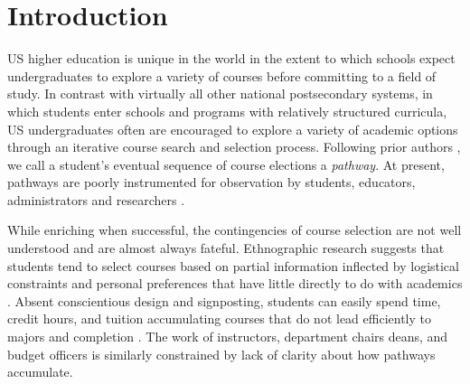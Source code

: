 \section{Introduction}



US higher education is unique in the world in the extent to
which schools expect undergraduates to explore a variety of courses before committing to a field of study. In contrast with virtually all other national postsecondary systems, in which students enter schools and programs with relatively structured curricula, US undergraduates often are encouraged to explore a variety of academic options through an iterative course search and selection process. Following prior authors \cite{armstrong2013paying,bailey2015redesigning}, we call a student's
eventual sequence of course elections a {\it pathway}. At present, pathways are poorly instrumented for observation by students, educators, administrators and researchers \cite{chambliss2014college}.

While enriching when successful, the contingencies of course selection are not well understood and are almost always fateful. Ethnographic research suggests that students tend to select courses based on partial information inflected by logistical constraints and personal preferences that have little directly to do with academics \cite{nathan2006my,rosenbaum2011complexities, rosenbaum2007after}. Absent conscientious design and signposting, students can easily spend time, credit hours, and tuition accumulating courses that do not lead efficiently to majors and completion \cite{bailey2015redesigning}. The work of instructors, department chairs deans, and budget officers is similarly constrained by lack of clarity about how pathways accumulate. 



